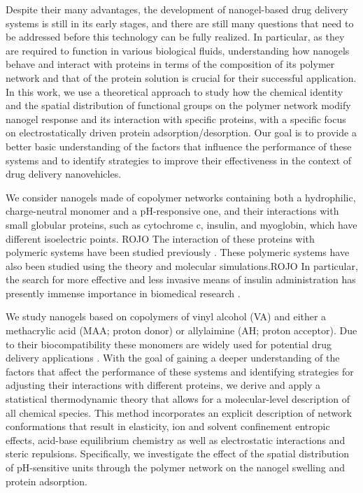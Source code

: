 Despite their many advantages, the development of nanogel-based drug delivery systems is still in its early stages, and there are still many questions that need to be addressed before this technology can be fully realized.
In particular, as they are required to function in various biological fluids, understanding how nanogels behave and interact with proteins in terms of the composition of its polymer network and that of the  protein solution is crucial for their successful application.
In this work, we use a theoretical approach to study how the chemical identity and the spatial distribution of functional groups on the polymer network modify nanogel response and its interaction with specific proteins, with a specific focus on electrostatically driven protein adsorption/desorption.
Our goal is to provide a better basic understanding of the factors that influence the performance of these systems and to identify strategies to improve their effectiveness in the context of drug delivery nanovehicles.






We consider nanogels made of copolymer networks containing both a hydrophilic, charge-neutral monomer and a pH-responsive one, and their interactions with small globular proteins, such as cytochrome c, insulin, and myoglobin, which have different isoelectric points.
ROJO
The interaction of these proteins with polymeric systems have been studied previously .
These polymeric systems have also been studied using the theory and molecular simulations.
ROJO
In particular, the search for more effective and less invasive means of insulin administration has presently immense importance in biomedical research .




We study nanogels based on copolymers of vinyl alcohol (VA) and either a methacrylic acid (MAA; proton donor) or allylaimine (AH; proton acceptor).
Due to their biocompatibility these monomers are widely used for potential drug delivery applications .
With the goal of gaining a deeper understanding of the factors that affect the performance of these systems and identifying strategies for adjusting their interactions with different proteins, we derive and apply a statistical thermodynamic theory that allows for a molecular-level description of all chemical species.
This method incorporates an explicit description of network conformations that result in elasticity, ion and solvent confinement entropic effects, acid-base equilibrium chemistry as well as electrostatic interactions and steric repulsions.
Specifically, we investigate the effect of the spatial distribution of pH-sensitive units through the polymer network on the nanogel swelling and protein adsorption.
